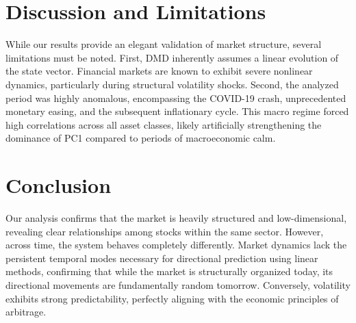 \documentclass[runningheads]{llncs}
\begin{document}
\section{Discussion and Limitations}
\label{sec:discussion}
While our results provide an elegant validation of market structure, several limitations must be noted. First, DMD inherently assumes a linear evolution of the state vector. Financial markets are known to exhibit severe nonlinear dynamics, particularly during structural volatility shocks.
Second, the analyzed period was highly anomalous, encompassing the COVID-19 crash, unprecedented monetary easing, and the subsequent inflationary cycle. This macro regime forced high correlations across all asset classes, likely artificially strengthening the dominance of PC1 compared to periods of macroeconomic calm.

\section{Conclusion}
\label{sec:conclusion}

Our analysis confirms that the market is heavily structured and low-dimensional, revealing clear relationships among stocks within the same sector. However, across time, the system behaves completely differently. Market dynamics lack the persistent temporal modes necessary for directional prediction using linear methods, confirming that while the market is structurally organized today, its directional movements are fundamentally random tomorrow. Conversely, volatility exhibits strong predictability, perfectly aligning with the economic principles of arbitrage.

\begingroup
\let\clearpage\relax
\vspace{2em}


\endgroup
\end{document}
